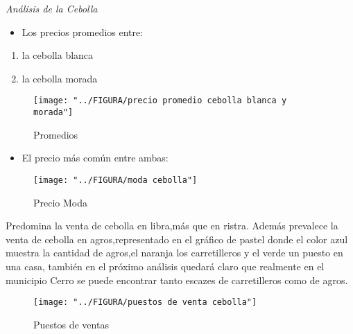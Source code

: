 \documentclass[10pt]{beamer}
\begin{document}
   	
   	\begin{frame}{\textit{Análisis de la Cebolla}}
   		
   		\begin{itemize}
   			\item{ Los precios promedios entre:}
   		\end{itemize}
   		
   		
   		\begin{enumerate}
   			\item {la cebolla blanca}
   			\item{la cebolla morada}
   		\end{enumerate}
   	  
   	  
   	  \begin{figure}[h]
   	  	\centering
   	  	\texttt{[image: "../FIGURA/precio promedio cebolla blanca y morada"]}
   	  	\caption{Promedios}
   	  	\label{fig:precio-promedio-cebolla-blanca-y-morada}
   	  \end{figure}
   	  
  	\end{frame}
   	
   	
   	\begin{frame}
   		 \begin{itemize}
   			\item{El precio más común entre ambas:}
   		\end{itemize}
   		
   		\begin{figure}
   			\centering
   			\texttt{[image: "../FIGURA/moda cebolla"]}
   			\caption{Precio Moda}
   			\label{fig:moda-cebolla}
   		\end{figure}
   \end{frame}		
   		
   	\begin{frame}
   		
   		Predomina la venta de cebolla en libra,más que en ristra.
   		Además prevalece la venta de cebolla en agros,representado en el gráfico de pastel donde el color azul muestra la cantidad de agros,el naranja los carretilleros y el  verde un puesto en una casa, también en el próximo análisis quedará claro que realmente en el municipio  Cerro se puede encontrar tanto escazes de carretilleros como de agros.
   		
   		\begin{figure}
   			\centering
   			\texttt{[image: "../FIGURA/puestos de venta cebolla"]}
   			\caption{Puestos de ventas}
   			\label{fig:puestos-de-venta-cebolla}
   		\end{figure}
   		
   	\end{frame}
   		
\end{document}
